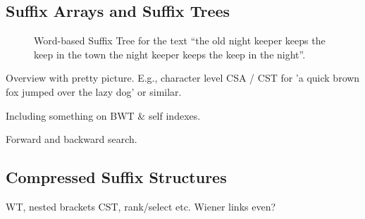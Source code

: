 
\subsection{Suffix Arrays and Suffix Trees}

\begin{figure}
\centering
\scalebox{0.9}{

}
\caption{Word-based Suffix Tree for the text ``the old night keeper keeps the keep in the town the night keeper keeps the keep in the night''.}
\end{figure}

Overview with pretty picture. E.g., character level CSA / CST for 
'a quick brown fox jumped over the lazy dog' or similar.

Including something on BWT \& self indexes.

Forward and backward search.

\subsection{Compressed Suffix Structures}

WT, nested brackets CST, rank/select etc. Wiener links even?
